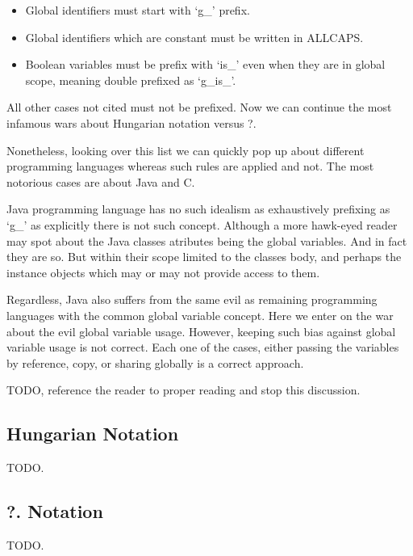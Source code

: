 \begin{englishtext}
\begin{itemize}
    \item Global identifiers must start with `g\_' prefix.

    \item Global identifiers which are constant must be written in ALLCAPS.

    \item Boolean variables must be prefix with `is\_' even when they are in
    global scope, meaning double prefixed as `g\_is\_'.

    \end{itemize}

    All other cases not cited must not be prefixed. Now we can continue the most
    infamous wars about Hungarian notation versus ?.

    Nonetheless, looking over this list we can quickly pop up about different
    programming languages whereas such rules are applied and not. The most
    notorious cases are about Java and C.

    Java programming language has no such idealism as exhaustively prefixing as
    `g\_' as explicitly there is not such concept. Although a more hawk-eyed
    reader may spot about the Java classes atributes being the global variables.
    And in fact they are so. But within their scope limited to the classes body,
    and perhaps the instance objects which may or may not provide access to
    them.

    Regardless, Java also suffers from the same evil as remaining programming
    languages with the common global variable concept. Here we enter on the
    war about the evil global variable usage. However, keeping such bias against
    global variable usage is not correct. Each one of the cases, either passing
    the variables by reference, copy, or sharing globally is a correct approach.

    TODO, reference the reader to proper reading and stop this discussion.


    \subsection{Hungarian Notation}

    TODO.


    \subsection{?. Notation}

    TODO.

\end{englishtext}


\lang{}{}


